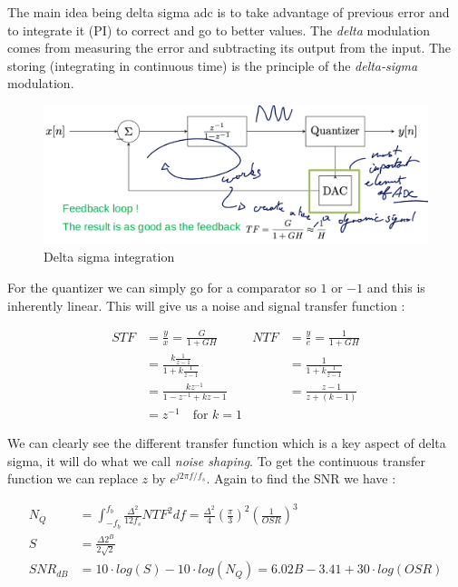\documentclass[
  a4paper,
]{article}
\begin{document}
The main idea being delta sigma {adc} is to take advantage of previous
error and to integrate it (PI) to correct and go to better values. The
\emph{delta} modulation comes from measuring the error and subtracting
its output from the input. The storing (integrating in continuous time)
is the principle of the \emph{delta-sigma} modulation.

\begin{figure}
\hypertarget{fig:delta-sigma-label}{%
\centering
\includegraphics{delta_sigma.png}
\caption{Delta sigma integration}\label{fig:delta-sigma-label}
}
\end{figure}

For the quantizer we can simply go for a comparator so \(1\) or \(-1\)
and this is inherently linear. This will give us a noise and signal
transfer function :

\[\begin{aligned}
STF &= \frac{y}{x} = \frac{G}{1 + GH} & NTF &=  \frac{y}{e} = \frac{1}{1 + GH} \\ 
&= \frac{k \frac{1}{z-1}}{1 + k \frac{1}{z-1}} & &= \frac{1}{1 + k \frac{1}{z-1}}\\ 
&= \frac{k z^{-1}}{1 - z^{-1} + k z-1} & &= \frac{z-1}{z+(k-1)} \\ 
&= z^{-1} \quad \text{for } k = 1
\end{aligned}\]

We can clearly see the different transfer function which is a key aspect
of delta sigma, it will do what we call \emph{noise shaping}. To get the
continuous transfer function we can replace \(z\) by
\(e^{j 2 \pi f/f_s}\). Again to find the SNR we have :

\[\begin{aligned}
    N_Q &= \int_{-f_b}^{f_b} \frac{\Delta^2}{12 f_s} NTF^2 df = \frac{\Delta^2}{4} \left(\frac{\pi}{3} \right)^2 \left( \frac{1}{OSR} \right)^3\\
    S &= \frac{\Delta 2^B}{2\sqrt{2}}\\
    SNR_{dB} &= 10 \cdot log(S) - 10 \cdot log(N_Q) = 6.02B-3.41+30\cdot log(OSR)  \label{eq:snr-noise}
\end{aligned}\]
\end{document}
